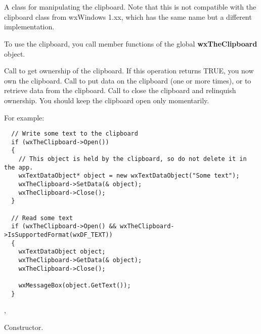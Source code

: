 \section{}\label{wxclipboard}

A class for manipulating the clipboard. Note that this is not compatible with the
clipboard class from wxWindows 1.xx, which has the same name but a different implementation.

To use the clipboard, you call member functions of the global {\bf wxTheClipboard} object.

Call  to get ownership of the clipboard. If this operation returns TRUE, you
now own the clipboard. Call  to put data
on the clipboard (one or more times), or  to
retrieve data from the clipboard. Call  to close
the clipboard and relinquish ownership. You should keep the clipboard open only momentarily.

For example:

\begin{verbatim}
  // Write some text to the clipboard
  if (wxTheClipboard->Open())
  {
    // This object is held by the clipboard, so do not delete it in the app.
    wxTextDataObject* object = new wxTextDataObject("Some text");
    wxTheClipboard->SetData(& object);
    wxTheClipboard->Close();
  }

  // Read some text
  if (wxTheClipboard->Open() && wxTheClipboard->IsSupportedFormat(wxDF_TEXT))
  {
    wxTextDataObject object;
    wxTheClipboard->GetData(& object);
    wxTheClipboard->Close();

    wxMessageBox(object.GetText());
  }
\end{verbatim}




, 




Constructor.


